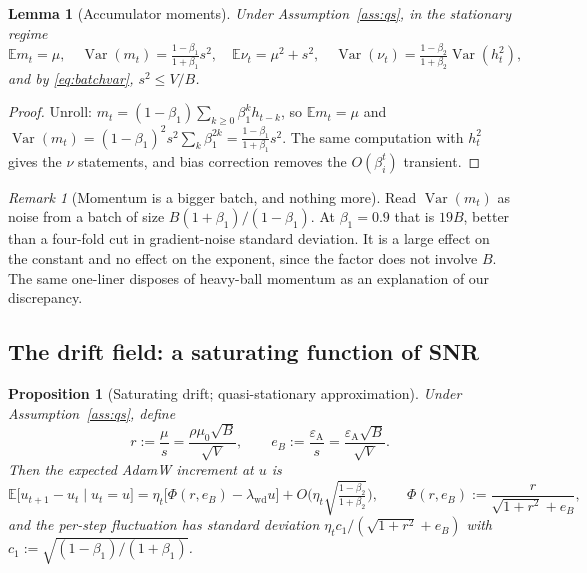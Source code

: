 \documentclass{article}
\theoremstyle{plain}
\newtheorem{proposition}{Proposition}
\newtheorem{lemma}{Lemma}
\theoremstyle{definition}
\theoremstyle{remark}
\newtheorem{remark}{Remark}
\newcommand{\E}{\mathbb{E}}
\newcommand{\Var}{\operatorname{Var}}
\newcommand{\1}{\mathbf{1}}
\newcommand{\wdc}{\mathrm{wd}}
\begin{document}
\begin{lemma}[Accumulator moments]
\label{lem:adammoments}
Under Assumption~\ref{ass:qs}, in the stationary regime
\begin{equation}
\label{eq:adammoments}
\E m_t = \mu,\quad
\Var(m_t) = \tfrac{1-\beta_1}{1+\beta_1}s^2,\quad
\E \nu_t = \mu^2 + s^2,\quad
\Var(\nu_t) = \tfrac{1-\beta_2}{1+\beta_2}\Var(h_t^2),
\end{equation}
and by \eqref{eq:batchvar}, $s^2\le V/B$.
\end{lemma}

\begin{proof}
Unroll: $m_t = (1-\beta_1)\sum_{k\ge0}\beta_1^kh_{t-k}$, so $\E m_t = \mu$ and
$\Var(m_t) = (1-\beta_1)^2s^2\sum_k\beta_1^{2k} = \frac{1-\beta_1}{1+\beta_1}s^2$.
The same computation with $h_t^2$ gives the $\nu$ statements, and bias correction
removes the $O(\beta_i^t)$ transient.
\end{proof}

\begin{remark}[Momentum is a bigger batch, and nothing more]
\label{rem:momentum}
Read $\Var(m_t)$ as noise from a batch of size $B(1+\beta_1)/(1-\beta_1)$. At
$\beta_1=0.9$ that is $19B$, better than a four-fold cut in gradient-noise
standard deviation. It is a large effect on the constant and no effect on the
exponent, since the factor does not involve $B$. The same one-liner disposes of
heavy-ball momentum as an explanation of our discrepancy.
\end{remark}

\subsection{The drift field: a saturating function of SNR}

\begin{proposition}[Saturating drift; quasi-stationary approximation]
\label{prop:adamdrift}
Under Assumption~\ref{ass:qs}, define
\begin{equation}
\label{eq:rdef}
r := \frac{\mu}{s} = \frac{\rho\mu_0\sqrt B}{\sqrt V},
\qquad
e_B := \frac{\varepsilon_{\mathrm A}}{s} = \frac{\varepsilon_{\mathrm A}\sqrt B}{\sqrt V}.
\end{equation}
Then the expected AdamW increment at $u$ is
\begin{equation}
\label{eq:adamphi}
\E\big[u_{t+1}-u_t \mid u_t = u\big]
= \eta_t\Big[\Phi(r,e_B) - \lambda_\wdc u\Big]
+ O\!\Big(\eta_t\sqrt{\tfrac{1-\beta_2}{1+\beta_2}}\Big),
\qquad
\Phi(r,e_B) := \frac{r}{\sqrt{1+r^2}+e_B},
\end{equation}
and the per-step fluctuation has standard deviation
$\eta_t c_1/(\sqrt{1+r^2}+e_B)$ with $c_1 := \sqrt{(1-\beta_1)/(1+\beta_1)}$.
\end{proposition}
\end{document}
